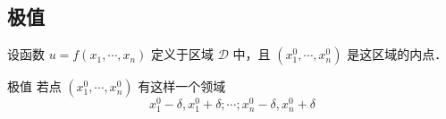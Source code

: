 
\subsection{极值}
设函数 $u=f(x_1,\cdots,x_n)$ 定义于区域 $\mathcal{D}$ 中，且 $(x_1^0,\cdots,x_n^0)$ 是这区域的内点．

\begin{definition}{极值}
若点 $(x_1^0,\cdots,x_n^0)$ 有这样一个领域
\[x_1^0-\delta,x_1^0+\delta;\cdots;x_n^0-\delta,x_n^0+\delta\]
\end{definition}